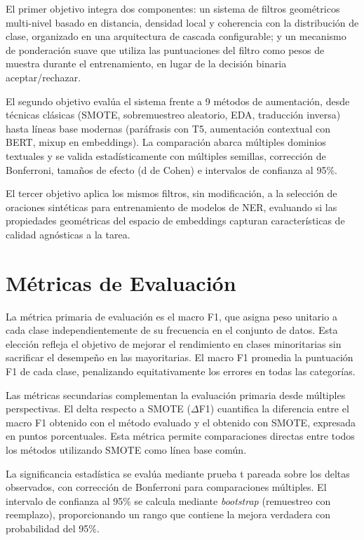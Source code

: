 El primer objetivo integra dos componentes: un sistema de filtros geométricos multi-nivel basado en distancia, densidad local y coherencia con la distribución de clase, organizado en una arquitectura de cascada configurable; y un mecanismo de ponderación suave que utiliza las puntuaciones del filtro como pesos de muestra durante el entrenamiento, en lugar de la decisión binaria aceptar/rechazar.

El segundo objetivo evalúa el sistema frente a 9 métodos de aumentación, desde técnicas clásicas (SMOTE, sobremuestreo aleatorio, EDA, traducción inversa) hasta líneas base modernas (paráfrasis con T5, aumentación contextual con BERT, mixup en embeddings). La comparación abarca múltiples dominios textuales y se valida estadísticamente con múltiples semillas, corrección de Bonferroni, tamaños de efecto (d de Cohen) e intervalos de confianza al 95\%.

El tercer objetivo aplica los mismos filtros, sin modificación, a la selección de oraciones sintéticas para entrenamiento de modelos de NER, evaluando si las propiedades geométricas del espacio de embeddings capturan características de calidad agnósticas a la tarea.

\section{Métricas de Evaluación}
\label{sec:metricas_evaluacion}

La métrica primaria de evaluación es el macro F1, que asigna peso unitario a cada clase independientemente de su frecuencia en el conjunto de datos. Esta elección refleja el objetivo de mejorar el rendimiento en clases minoritarias sin sacrificar el desempeño en las mayoritarias. El macro F1 promedia la puntuación F1 de cada clase, penalizando equitativamente los errores en todas las categorías.

Las métricas secundarias complementan la evaluación primaria desde múltiples perspectivas. El delta respecto a SMOTE ($\Delta$F1) cuantifica la diferencia entre el macro F1 obtenido con el método evaluado y el obtenido con SMOTE, expresada en puntos porcentuales. Esta métrica permite comparaciones directas entre todos los métodos utilizando SMOTE como línea base común.

La significancia estadística se evalúa mediante prueba t pareada sobre los deltas observados, con corrección de Bonferroni para comparaciones múltiples. El intervalo de confianza al 95\% se calcula mediante \textit{bootstrap} (remuestreo con reemplazo), proporcionando un rango que contiene la mejora verdadera con probabilidad del 95\%.

